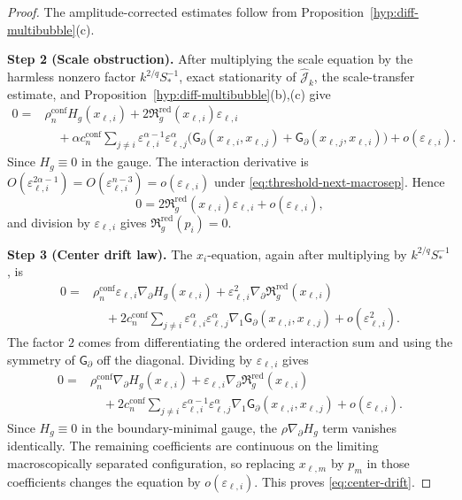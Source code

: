 \documentclass[11pt,reqno,a4paper]{amsart}
\numberwithin{equation}{section}
\theoremstyle{plain}
\theoremstyle{remark}
\theoremstyle{plain}
\begin{document}
\begin{proof}
The amplitude-corrected estimates follow from
Proposition~\ref{hyp:diff-multibubble}\textup{(c)}.

\smallskip\noindent
\textbf{Step 2 (Scale obstruction).}
After multiplying the scale equation by the harmless nonzero factor $k^{2/q}S_\ast^{-1}$, exact stationarity of
$\hat{\mathcal J}_k$, the scale-transfer estimate, and
Proposition~\ref{hyp:diff-multibubble}\textup{(b),(c)} give
\begin{align*}
0={}&\rho_n^{\mathrm{conf}}H_g(x_{\ell,i})
+2\mathfrak R_g^{\mathrm{red}}(x_{\ell,i})\varepsilon_{\ell,i} \\
&\quad
+\alpha c_n^{\mathrm{conf}}\sum_{j\ne i}
\varepsilon_{\ell,i}^{\alpha-1}\varepsilon_{\ell,j}^{\alpha}
\bigl(\mathsf G_\partial(x_{\ell,i},x_{\ell,j})+
\mathsf G_\partial(x_{\ell,j},x_{\ell,i})\bigr)
+o(\varepsilon_{\ell,i}).
\end{align*}
Since $H_g\equiv0$ in the gauge.  The interaction derivative is
$O(\varepsilon_{\ell,i}^{2\alpha-1})=O(\varepsilon_{\ell,i}^{n-3})=o(\varepsilon_{\ell,i})$ under
\eqref{eq:threshold-next-macrosep}.  Hence
\[
0=2\mathfrak R_g^{\mathrm{red}}(x_{\ell,i})\varepsilon_{\ell,i}+o(\varepsilon_{\ell,i}),
\]
and division by $\varepsilon_{\ell,i}$ gives $\mathfrak R_g^{\mathrm{red}}(p_i)=0$.

\smallskip\noindent
\textbf{Step 3 (Center drift law).}
The $x_i$-equation, again after multiplying by $k^{2/q}S_\ast^{-1}$, is
\begin{align*}
0={}&\rho_n^{\mathrm{conf}}\varepsilon_{\ell,i}
\nabla_\partial H_g(x_{\ell,i})
+\varepsilon_{\ell,i}^2
\nabla_\partial\mathfrak R_g^{\mathrm{red}}(x_{\ell,i}) \\
&\quad
+2c_n^{\mathrm{conf}}\sum_{j\ne i}
\varepsilon_{\ell,i}^{\alpha}\varepsilon_{\ell,j}^{\alpha}
\nabla_1\mathsf G_\partial(x_{\ell,i},x_{\ell,j})
+o(\varepsilon_{\ell,i}^2).
\end{align*}
The factor $2$ comes from differentiating the ordered interaction sum and using the symmetry of
$\mathsf G_\partial$ off the diagonal.  Dividing by $\varepsilon_{\ell,i}$ gives
\begin{align*}
0={}&\rho_n^{\mathrm{conf}}\nabla_\partial H_g(x_{\ell,i})
+\varepsilon_{\ell,i}\nabla_\partial\mathfrak R_g^{\mathrm{red}}(x_{\ell,i}) \\
&\quad
+2c_n^{\mathrm{conf}}\sum_{j\ne i}
\varepsilon_{\ell,i}^{\alpha-1}\varepsilon_{\ell,j}^{\alpha}
\nabla_1\mathsf G_\partial(x_{\ell,i},x_{\ell,j})
+o(\varepsilon_{\ell,i}).
\end{align*}
Since $H_g\equiv0$ in the boundary-minimal gauge, the $\rho\nabla_\partial H_g$ term vanishes identically.
The remaining coefficients are continuous on the limiting macroscopically separated configuration, so replacing
$x_{\ell,m}$ by $p_m$ in those coefficients changes the equation by $o(\varepsilon_{\ell,i})$.  This proves
\eqref{eq:center-drift}.
\end{proof}
\end{document}
